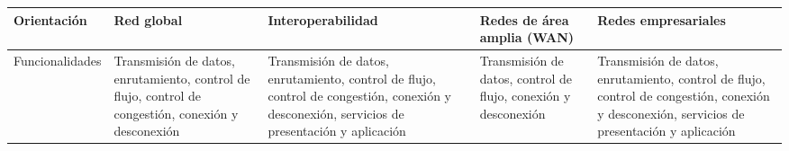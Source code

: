 \begin{longtable}{|>{\raggedright\arraybackslash}m{2.4cm}|>{\raggedright\arraybackslash}m{2.8cm}|>{\raggedright\arraybackslash}m{2.8cm}|>{\raggedright\arraybackslash}m{2.8cm}|>{\raggedright\arraybackslash}m{2.8cm}|}
    Orientación             & Red global                                                                                                                                                                             & Interoperabilidad                                                                                                                                                                                                                                    & Redes de área amplia (WAN)                                                                                                                                                                                                                                                                                                                                                       & Redes empresariales                                                                                                                                                                                                                                                                    \\ \hline
    Funcionalidades         & Transmisión de datos, enrutamiento, control de flujo, control de congestión, conexión y desconexión                                                                                    & Transmisión de datos, enrutamiento, control de flujo, control de congestión, conexión y desconexión, servicios de presentación y aplicación                                                                                                          & Transmisión de datos, control de flujo, conexión y desconexión                                                                                                                                                                                                                                                                                                                   & Transmisión de datos, enrutamiento, control de flujo, control de congestión, conexión y desconexión, servicios de presentación y aplicación                                                                                                                                            \\ \hline

\end{longtable}
